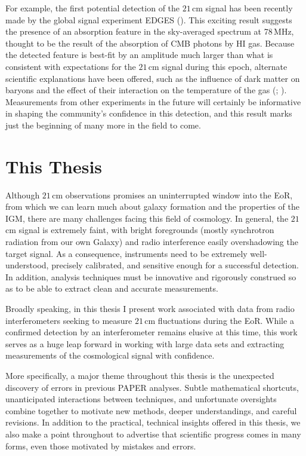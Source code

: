For example, the first potential detection of the $21$\,cm signal has been recently made by the global signal experiment EDGES (\citealt{bowman_et_al2018}). This exciting result suggests the presence of an absorption feature in the sky-averaged spectrum at 78\,MHz, thought to be the result of the absorption of CMB photons by HI gas. Because the detected feature is best-fit by an amplitude much larger than what is consistent with expectations for the $21$\,cm signal during this epoch, alternate scientific explanations have been offered, such as the influence of dark matter on baryons and the effect of their interaction on the temperature of the gas (\citealt{barkana2018}; \citealt{slatyer_wu2018}). Measurements from other experiments in the future will certainly be informative in shaping the community's confidence in this detection, and this result marks just the beginning of many more in the field to come.

\section{This Thesis}

Although $21$\,cm observations promises an uninterrupted window into the EoR, from which we can learn much about galaxy formation and the properties of the IGM, there are many challenges facing this field of cosmology. In general, the $21$\,cm signal is extremely faint, with bright foregrounds (mostly synchrotron radiation from our own Galaxy) and radio interference easily overshadowing the target signal. As a consequence, instruments need to be extremely well-understood, precisely calibrated, and sensitive enough for a successful detection. In addition, analysis techniques must be innovative and rigorously construed so as to be able to extract clean and accurate measurements.

Broadly speaking, in this thesis I present work associated with data from radio interferometers seeking to measure $21$\,cm fluctuations during the EoR. While a confirmed detection by an interferometer remains elusive at this time, this work serves as a huge leap forward in working with large data sets and extracting measurements of the cosmological signal with confidence. 

More specifically, a major theme throughout this thesis is the unexpected discovery of errors in previous PAPER analyses. Subtle mathematical shortcuts, unanticipated interactions between techniques, and unfortunate oversights combine together to motivate new methods, deeper understandings, and careful revisions. In addition to the practical, technical insights offered in this thesis, we also make a point throughout to advertise that scientific progress comes in many forms, even those motivated by mistakes and errors.

